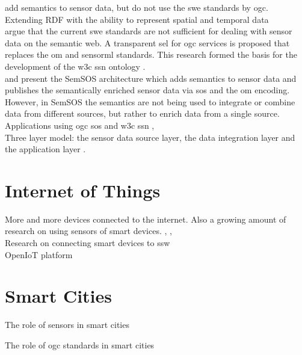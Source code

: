 \cite{SSW:Huang} add semantics to sensor data, but do not use the \ac{swe} standards by \ac{ogc}. \\ 

Extending RDF with the ability to represent spatial and temporal data \citep{SSW:Koubarakis} \\ 

\cite{SSW:Janowicz2} argue that the current \ac{swe} standards are not sufficient for dealing with sensor data on the semantic web. A transparent \ac{sel} for \ac{ogc} services is proposed that replaces the \ac{om} and \ac{sensorml} standards. This research formed the basis for the development of the \ac{w3c} \ac{ssn} ontology \citep{SSW:SSN_incubatorGroup}. \\ 

\cite{SSW:Henson} and \cite{SSW:Pschorr} present the SemSOS architecture which adds semantics to sensor data and publishes the semantically enriched sensor data via \ac{sos} and the \ac{om} encoding. However, in SemSOS the semantics are not being used to integrate or combine data from different sources, but rather to enrich data from a single source. \\ 

Applications using \ac{ogc} \ac{sos} and \ac{w3c} \ac{ssn} \citep{SSW:Kessler}, \citep{SSW:Barnaghi} \\

Three layer model: the sensor data source layer, the data integration layer and the application layer \cite{SSW:Wang}.

\section{Internet of Things}

More and more devices connected to the internet. Also a growing amount of research on using sensors of smart devices. \citep{IOT:Waher}, \citep{IOT:Zarko}, \citep{SSW:Calbimonte} \\

Research on connecting smart devices to \ac{ssw} \citep{SSW:Vera}  \\

OpenIoT platform \citep{IOT:Calbimonte}


\section{Smart Cities} 

The role of sensors in smart cities \citep{IOT:Zanelli}

The role of \ac{ogc} standards in smart cities \citep{SC:OGC}
\fi
